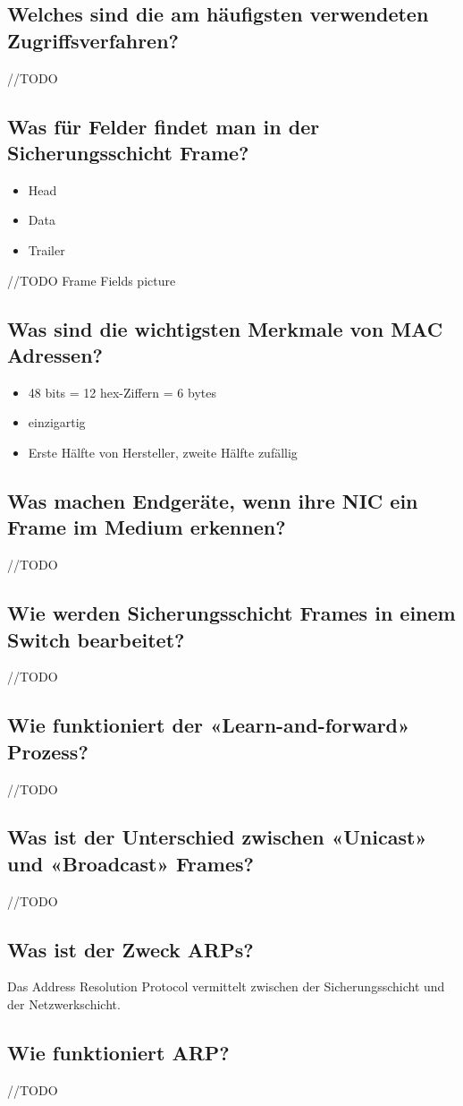\subsection*{Welches sind die am häufigsten verwendeten Zugriffsverfahren?}
//TODO
\subsection*{Was für Felder findet man in der Sicherungsschicht Frame?}
\begin{itemize}
    \item Head
    \item Data
    \item Trailer
\end{itemize}
//TODO Frame Fields picture
\subsection*{Was sind die wichtigsten Merkmale von MAC Adressen?}
\begin{itemize}
    \item 48 bits = 12 hex-Ziffern = 6 bytes
    \item einzigartig
    \item Erste Hälfte von Hersteller, zweite Hälfte zufällig
\end{itemize}
\subsection*{Was machen Endgeräte, wenn ihre NIC ein Frame im Medium erkennen?}
//TODO
\subsection*{Wie werden Sicherungsschicht Frames in einem Switch bearbeitet? }
//TODO
\subsection*{Wie funktioniert der «Learn-and-forward» Prozess?}
//TODO
\subsection*{Was ist der Unterschied zwischen «Unicast» und «Broadcast» Frames?}
//TODO
\subsection*{Was ist der Zweck ARPs?}
Das Address Resolution Protocol vermittelt zwischen der Sicherungsschicht und der Netzwerkschicht.
\subsection*{Wie funktioniert ARP?}
//TODO